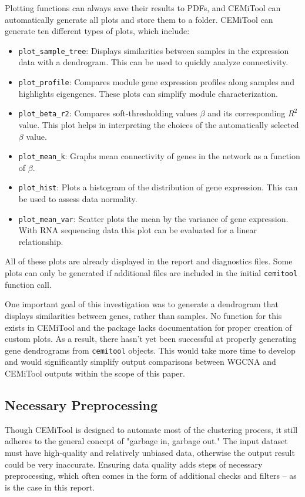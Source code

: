 Plotting functions can always save their results to PDFs, and CEMiTool can automatically generate all plots and store them to a folder. CEMiTool can generate ten different types of plots, which include:
\begin{itemize}
  \item \texttt{plot\_sample\_tree}: Displays similarities between samples in the expression data with a dendrogram. This can be used to quickly analyze connectivity.
  \item \texttt{plot\_profile}: Compares module gene expression profiles along samples and highlights eigengenes. These plots can simplify module characterization.
  \item \texttt{plot\_beta\_r2}: Compares soft-thresholding values $\beta$ and its corresponding $R^2$ value. This plot helps in interpreting the choices of the automatically selected $\beta$ value.
  \item \texttt{plot\_mean\_k}: Graphs mean connectivity of genes in the network as a function of $\beta$. 
  \item \texttt{plot\_hist}: Plots a histogram of the distribution of gene expression. This can be used to assess data normality.
  \item \texttt{plot\_mean\_var}: Scatter plots the mean by the variance of gene expression. With RNA sequencing data this plot can be evaluated for a linear relationship.~\cite{cem-docs}
\end{itemize}

\noindent All of these plots are already displayed in the report and diagnostics files. Some plots can only be generated if additional files are included in the initial \texttt{cemitool} function call. 

One important goal of this investigation was to generate a dendrogram that displays similarities between genes, rather than samples. No function for this exists in CEMiTool and the package lacks documentation for proper creation of custom plots. As a result, there hasn't yet been successful at properly generating gene dendrograms from \texttt{cemitool} objects. This would take more time to develop and would significantly simplify output comparisons between WGCNA and CEMiTool outputs within the scope of this paper.

\subsection{Necessary Preprocessing}
\label{subsec: preprocessing}
Though CEMiTool is designed to automate most of the clustering process, it still adheres to the general concept of "garbage in, garbage out." The input dataset must have high-quality and relatively unbiased data, otherwise the output result could be very inaccurate. Ensuring data quality adds steps of necessary preprocessing, which often comes in the form of additional checks and filters -- as is the case in this report. 

